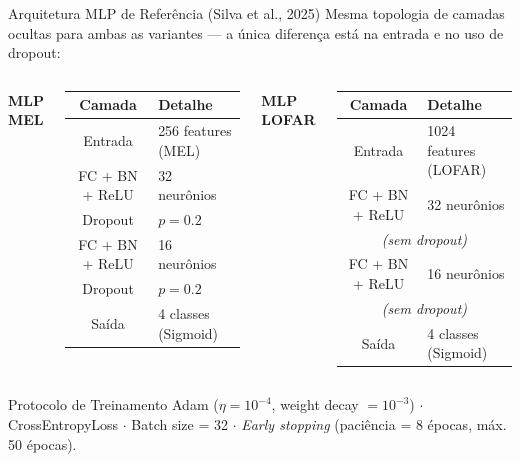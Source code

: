 \documentclass{beamer}
\begin{document}
\begin{frame}{Arquitetura MLP de Referência (Silva et al., 2025)}
    \footnotesize
    Mesma topologia de camadas ocultas para ambas as variantes — a única diferença está na entrada e no uso de dropout:

    \vspace{0.15cm}
    \begin{columns}[t]
        \centering
        \textbf{MLP MEL}\\[0.15cm]
        \scriptsize
        \begin{tabular}{cl}
            \toprule
            \textbf{Camada} & \textbf{Detalhe} \\
            \midrule
            Entrada        & 256 features (MEL) \\
            FC + BN + ReLU & 32 neurônios \\
            Dropout        & $p = 0.2$ \\
            FC + BN + ReLU & 16 neurônios \\
            Dropout        & $p = 0.2$ \\
            Saída          & 4 classes (Sigmoid) \\
            \bottomrule
        \end{tabular}


        \centering
        \textbf{MLP LOFAR}\\[0.15cm]
        \scriptsize
        \begin{tabular}{cl}
            \toprule
            \textbf{Camada} & \textbf{Detalhe} \\
            \midrule
            Entrada        & 1024 features (LOFAR) \\
            FC + BN + ReLU & 32 neurônios \\
            \multicolumn{2}{c}{\textit{(sem dropout)}} \\
            FC + BN + ReLU & 16 neurônios \\
            \multicolumn{2}{c}{\textit{(sem dropout)}} \\
            Saída          & 4 classes (Sigmoid) \\
            \bottomrule
        \end{tabular}

    \end{columns}

    \vspace{0.15cm}
    \begin{block}{\scriptsize Protocolo de Treinamento}
        \scriptsize
        Adam ($\eta = 10^{-4}$, weight decay $= 10^{-3}$) $\cdot$ CrossEntropyLoss $\cdot$ Batch size = 32 $\cdot$ \textit{Early stopping} (paciência = 8 épocas, máx. 50 épocas).
    \end{block}
\end{frame}
\end{document}
